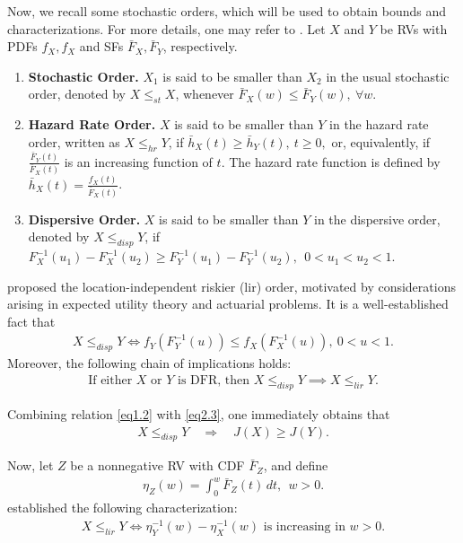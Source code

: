\documentclass[12pt,a4paper]{article}
\numberwithin{equation}{section}
\begin{document}
Now, we recall some stochastic orders, which will be used to obtain bounds and characterizations. For more details, one may refer to \cite{shaked2007}. Let $X$ and $Y$ be RVs with PDFs $f_{X},f_{X}$ and SFs $\bar F_{X},\bar F_{Y}$, respectively.
\begin{enumerate}
    \item \textbf{Stochastic Order.}  
     $X_1$ is said to be smaller than $X_2$ in the usual stochastic order, denoted by
    $X \leq_{st} X$, whenever $\bar F_{X}(w)\leq \bar F_{Y}(w), ~\forall w.$
    \item \textbf{Hazard Rate Order.} 
   $X$ is said to be smaller than $Y$ in the hazard rate order, written as
    $X \leq_{hr} Y$, if $ \bar h_X(t)\geq \bar h_Y(t), ~ t\geq 0,$
    or, equivalently, if $\frac{\bar F_{Y}(t)}{\bar F_{X}(t)}$
    is an increasing function of $t$. 
    The hazard rate function is defined by $\bar h_X(t)=\frac{f_{X}(t)}{\bar F_{X}(t)}$.

    \item \textbf{Dispersive Order.} 
     $X$ is said to be smaller than $Y$ in the dispersive order, denoted by
    $X \leq_{disp} Y$, if
$F_{X}^{-1}(u_1)-F_{X}^{-1}(u_2)\geq  F_{Y}^{-1}(u_1)-F_{Y}^{-1}(u_2),
        ~~ 0<u_1<u_2<1.$
\end{enumerate}
\cite{jew1989} proposed the location-independent riskier (lir) order, motivated by considerations arising in expected utility theory and actuarial problems. It is a well-established fact that
\begin{align*}
    X\leq_{disp}Y
    \iff 
    f_{Y}\!\left(F_{Y}^{-1}(u)\right)
    \leq
    f_{X}\!\left(F_{X}^{-1}(u)\right),~ 0<u<1.
\end{align*}
Moreover, the following chain of implications holds:
\begin{align}\label{eq2.3}
    \text{If either $X$ or $Y$ is DFR, then }
    X\leq_{disp}Y
    \implies
    X\leq_{lir}Y.
\end{align}

Combining relation \eqref{eq1.2} with \eqref{eq2.3}, one immediately obtains that
\begin{align}\label{eq::2.4}
    X\leq_{disp}Y
    \quad \Longrightarrow \quad
    J(X)\geq J(Y).
\end{align}

Now, let $Z$ be a nonnegative RV with CDF $\bar F_{Z}$, and define
\begin{align*}
    \eta_Z(w)
    =
    \int_0^w \bar F_Z(t)\,dt,~~ w>0.
\end{align*}
\cite{land1994} established the following characterization:
\begin{align}\label{eq2.4}
    X\leq_{lir}Y
    \iff
    \eta_Y^{-1}(w)-\eta_X^{-1}(w)
    \text{ is increasing in } w>0.
\end{align}
\end{document}
